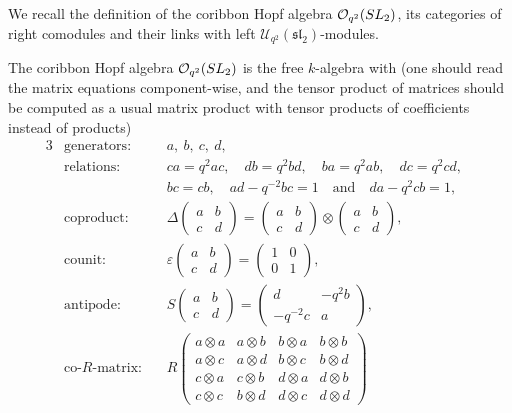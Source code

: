 \documentclass[11pt]{article}
\numberwithin{equation}{section}
\numberwithin{equation}{section}
\newcommand{\Oq}{\mathcal{O}_{q^2}({\rm SL}_2)}
\newcommand{\Uq}{\mathcal{U}_{q^2}(\mathfrak{sl}_2)}
\begin{document}
We recall the definition of the coribbon Hopf algebra $\Oq$, its categories of right comodules and their links with left $\Uq$-modules.
\begin{Definition}
The coribbon Hopf algebra $\Oq$ is the free $k$-algebra with
(one should read the matrix equations component-wise, and the tensor product of matrices should be computed as a usual matrix product with tensor products of coefficients instead of products)
\begin{alignat*}{3}
& \text{generators}\colon&& a,\ b,\ c,\ d,&
\\
& \text{relations}\colon&& ca = q^2ac,\quad db = q^2bd,\quad ba = q^2ab,\quad dc = q^2cd,&
\\
&&& bc = cb,\quad ad - q^{-2}bc = 1\quad \text{and}\quad da - q^2cb = 1,&
\\
&\text{coproduct}\colon&&\Delta\begin{pmatrix} a & b \\[-.5ex] c & d \end{pmatrix}
= \begin{pmatrix} a & b \\[-.5ex] c & d \end{pmatrix} \otimes \begin{pmatrix} a & b \\[-.5ex] c & d \end{pmatrix}\!,&
\\
& \text{counit}\colon&& \varepsilon \begin{pmatrix} a & b \\[-.5ex] c & d \end{pmatrix}
= \begin{pmatrix} 1& 0 \\[-.5ex] 0 & 1\end{pmatrix}\!,&
\\
& \text{antipode}\colon&& S \begin{pmatrix} a & b \\[-.5ex] c & d \end{pmatrix}
= \begin{pmatrix} d & -q^2b \\[-.5ex] -q^{-2}c & a \end{pmatrix}\!,&
\\
&\text{co-}R\text{-matrix}\colon&& R \begin{pmatrix}
a \otimes a & a \otimes b & b \otimes a & b \otimes b
\\
a \otimes c & a \otimes d & b \otimes c & b\otimes d\\ c\otimes a & c\otimes b & d \otimes a & d\otimes b\\ c\otimes c & b\otimes d & d\otimes c & d\otimes d \end{pmatrix}

\end{alignat*}
\end{Definition}
\end{document}
